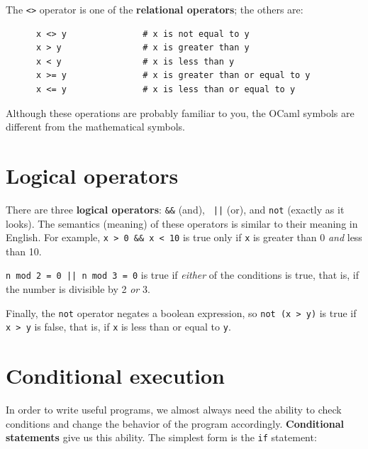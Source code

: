 \documentclass[10pt]{book}
\begin{document}
The {\tt <>} operator is one of the {\bf relational operators}; the
others are:

\beforeverb
\begin{verbatim}
      x <> y               # x is not equal to y
      x > y                # x is greater than y
      x < y                # x is less than y
      x >= y               # x is greater than or equal to y
      x <= y               # x is less than or equal to y
\end{verbatim}
\afterverb
%
Although these operations are probably familiar to you, the OCaml
symbols are different from the mathematical symbols.





\section {Logical operators}

There are three {\bf logical operators}: {\tt \verb"&&"} (and), {\tt
\verb"||"} (or), and {\tt not} (exactly as it looks).  The semantics (meaning) of these operators is
similar to their meaning in English.  For example,
{\tt x > 0 \verb"&&" x < 10} is true only if {\tt x} is greater than 0
{\em and} less than 10.


{\tt n mod 2 = 0 || n mod 3 = 0} is true if {\em either} of the conditions
is true, that is, if the number is divisible by 2 {\em or} 3.

Finally, the {\tt not} operator negates a boolean
expression, so {\tt not (x > y)} is true if {\tt x > y} is false,
that is, if {\tt x} is less than or equal to {\tt y}.

\section{Conditional execution}
\label{conditional execution}


In order to write useful programs, we almost always need the ability
to check conditions and change the behavior of the program
accordingly.  {\bf Conditional statements} give us this ability.  The
simplest form is the {\tt if} statement:
\end{document}

